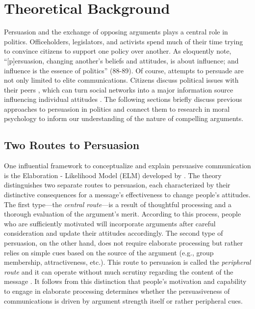 


\section{Theoretical Background}

Persuasion and the exchange of opposing arguments plays a central role in politics. Officeholders, legislators, and activists spend much of their time trying to convince citizens to support one policy over another. As \citet{cobb1997changing} eloquently note, ``[p]ersuasion, changing another's beliefs and attitudes, is about influence; and influence is the essence of politics'' (88-89). Of course, attempts to persuade are not only limited to elite communications. Citizens discuss political issues with their peers \citep[albeit not everyone, see for example][]{schmitt2023people,schmitt2022prerequisites}, which can turn social networks into a major information source influencing individual attitudes \citep[e.g.,][]{huckfeldt1995political,ahn2010communication,lazer2010coevolution}. The following sections briefly discuss previous approaches to persuasion in politics and connect them to research in moral psychology to inform our understanding of the nature of compelling arguments.



\subsection{Two Routes to Persuasion}

One influential framework to conceptualize and explain persuasive communication is the Elaboration - Likelihood Model (ELM) developed by \citet{petty1986communication,petty1986elaboration}. The theory distinguishes two separate routes to persuasion, each characterized by their distinctive consequences for a message's effectiveness to change people's attitudes. The first type---the \textit{central route}---is a result of thoughtful processing and a thorough evaluation of the argument's merit. According to this process, people who are sufficiently motivated will incorporate arguments after careful consideration and update their attitudes accordingly. The second type of persuasion, on the other hand, does not require elaborate processing but rather relies on simple cues based on the source of the argument (e.g., group membership, attractiveness, etc.). This route to persuasion is called the \textit{peripheral route} and it can operate without much scrutiny regarding the content of the message \citep[see also][for a similar distinction between systematic and heuristic processing]{chaiken1989heuristic}. It follows from this distinction that people's motivation and capability to engage in elaborate processing determines whether the persuasiveness of communications is driven by argument strength itself or rather peripheral cues.

